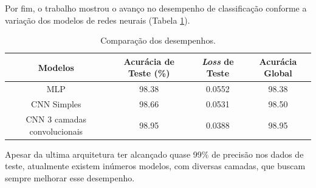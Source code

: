 \documentclass[12pt]{article}
\begin{document}
Por fim, o trabalho mostrou o avanço no desempenho de classificação conforme a variação dos modelos de redes neurais (Tabela \ref{table}). 



\begin{table}[H]
	\centering
	\caption{Comparação dos desempenhos.}
	\label{table}
	\begin{tabular}{ |c|c|c|c| } 
		\hline
		Modelos 						 & Acurácia de Teste (\%) & \textit{Loss} de Teste & Acurácia Global \\ 
		\hline
		MLP 						     & 98.38 & 0.0552 & 98.38\\ 
		CNN Simples 				     & 98.66 & 0.0531& 98.50\\ 
		CNN 3 camadas convolucionais     & 98.95 & 0.0388& 98.95\\ 
		\hline
	\end{tabular}
\end{table}

Apesar da ultima arquitetura ter alcançado quase 99\% de precisão nos dados de teste, atualmente existem inúmeros modelos, com diversas camadas, que buscam sempre melhorar esse desempenho.
\end{document}
